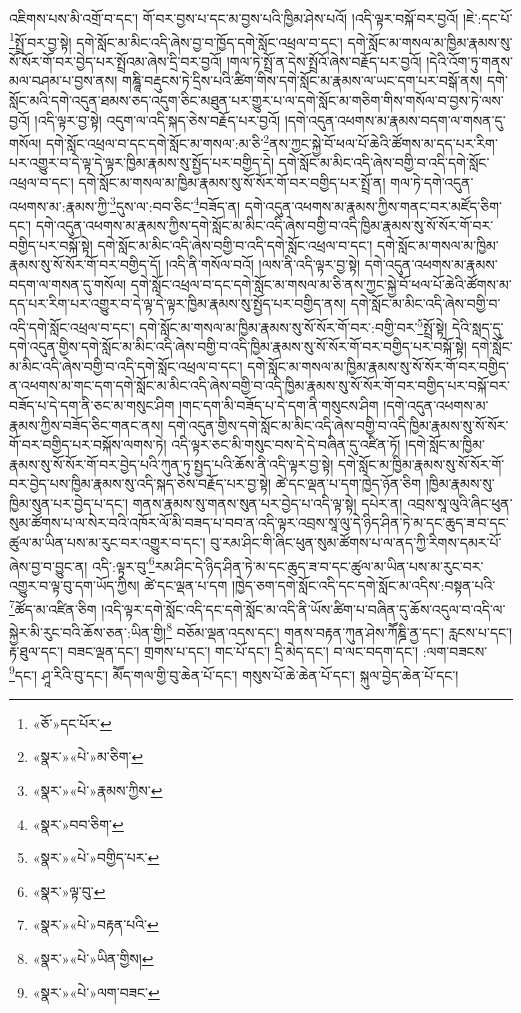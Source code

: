 འཇིགས་པས་མི་འགྲོ་བ་དང་། གོ་བར་བྱས་པ་དང་མ་བྱས་པའི་ཁྱིམ་ཤེས་པའོ། །འདི་ལྟར་བསྐོ་བར་བྱའོ། །ཇེ་:དང་པོ་\footnote{«ཅོ་»དང་པོར་}སྤྲོ་བར་བྱ་སྟེ། དགེ་སློང་མ་མིང་འདི་ཞེས་བྱ་བ་ཁྱོད་དགེ་སློང་འཕྲལ་བ་དང་། དགེ་སློང་མ་གསལ་མ་ཁྱིམ་རྣམས་སུ་སོ་སོར་གོ་བར་བྱེད་པར་སྤྲོའམ་ཞེས་དྲི་བར་བྱའོ། །གལ་ཏེ་སྤྲོ་ན་དེས་སྤྲོའོ་ཞེས་བརྗོད་པར་བྱའོ། །དེའི་འོག་ཏུ་གནས་མལ་བཤམ་པ་བྱས་ནས། གཎྜཱི་བརྡུངས་ཏེ་དྲིས་པའི་ཚིག་གིས་དགེ་སློང་མ་རྣམས་ལ་ཡང་དག་པར་བསྒོ་ནས། དགེ་སློང་མའི་དགེ་འདུན་ཐམས་ཅད་འདུག་ཅིང་མཐུན་པར་གྱུར་པ་ལ་དགེ་སློང་མ་གཅིག་གིས་གསོལ་བ་བྱས་ཏེ་ལས་བྱའོ། །འདི་ལྟར་བྱ་སྟེ། འདུག་ལ་འདི་སྐད་ཅེས་བརྗོད་པར་བྱའོ། །དགེ་འདུན་འཕགས་མ་རྣམས་བདག་ལ་གསན་དུ་གསོལ། དགེ་སློང་འཕྲལ་བ་དང་དགེ་སློང་མ་གསལ་:མ་ཅི་\footnote{«སྣར་»«པེ་»མ་ཅིག་}ནས་ཀྱང་སྐྱེ་བོ་ཕལ་པོ་ཆེའི་ཚོགས་མ་དད་པར་རིག་པར་འགྱུར་བ་དེ་ལྟ་དེ་ལྟར་ཁྱིམ་རྣམས་སུ་སྤྱོད་པར་བགྱིད་དེ། དགེ་སློང་མ་མིང་འདི་ཞེས་བགྱི་བ་འདི་དགེ་སློང་འཕྲལ་བ་དང་། དགེ་སློང་མ་གསལ་མ་ཁྱིམ་རྣམས་སུ་སོ་སོར་གོ་བར་བགྱིད་པར་སྤྲོ་ན། གལ་ཏེ་དགེ་འདུན་འཕགས་མ་:རྣམས་ཀྱི་\footnote{«སྣར་»«པེ་»རྣམས་ཀྱིས་}དུས་ལ་:བབ་ཅིང་\footnote{«སྣར་»བབ་ཅིག་}བཟོད་ན། དགེ་འདུན་འཕགས་མ་རྣམས་ཀྱིས་གནང་བར་མཛོད་ཅིག་དང་། དགེ་འདུན་འཕགས་མ་རྣམས་ཀྱིས་དགེ་སློང་མ་མིང་འདི་ཞེས་བགྱི་བ་འདི་ཁྱིམ་རྣམས་སུ་སོ་སོར་གོ་བར་བགྱིད་པར་བསྐོ་སྟེ། དགེ་སློང་མ་མིང་འདི་ཞེས་བགྱི་བ་འདི་དགེ་སློང་འཕྲལ་བ་དང་། དགེ་སློང་མ་གསལ་མ་ཁྱིམ་རྣམས་སུ་སོ་སོར་གོ་བར་བགྱིད་དོ། །འདི་ནི་གསོལ་བའོ། །ལས་ནི་འདི་ལྟར་བྱ་སྟེ། དགེ་འདུན་འཕགས་མ་རྣམས་བདག་ལ་གསན་དུ་གསོལ། དགེ་སློང་འཕྲལ་བ་དང་དགེ་སློང་མ་གསལ་མ་ཅི་ནས་ཀྱང་སྐྱེ་བོ་ཕལ་པོ་ཆེའི་ཚོགས་མ་དད་པར་རིག་པར་འགྱུར་བ་དེ་ལྟ་དེ་ལྟར་ཁྱིམ་རྣམས་སུ་སྤྱོད་པར་བགྱིད་ནས། དགེ་སློང་མ་མིང་འདི་ཞེས་བགྱི་བ་འདི་དགེ་སློང་འཕྲལ་བ་དང་། དགེ་སློང་མ་གསལ་མ་ཁྱིམ་རྣམས་སུ་སོ་སོར་གོ་བར་:བགྱི་བར་\footnote{«སྣར་»«པེ་»བགྱིད་པར་}སྤྲོ་སྟེ། དེའི་སླད་དུ་དགེ་འདུན་གྱིས་དགེ་སློང་མ་མིང་འདི་ཞེས་བགྱི་བ་འདི་ཁྱིམ་རྣམས་སུ་སོ་སོར་གོ་བར་བགྱིད་པར་བསྐོ་སྟེ། དགེ་སློང་མ་མིང་འདི་ཞེས་བགྱི་བ་འདི་དགེ་སློང་འཕྲལ་བ་དང་། དགེ་སློང་མ་གསལ་མ་ཁྱིམ་རྣམས་སུ་སོ་སོར་གོ་བར་བགྱིད་ན་འཕགས་མ་གང་དག་དགེ་སློང་མ་མིང་འདི་ཞེས་བགྱི་བ་འདི་ཁྱིམ་རྣམས་སུ་སོ་སོར་གོ་བར་བགྱིད་པར་བསྐོ་བར་བཟོད་པ་དེ་དག་ནི་ཅང་མ་གསུང་ཤིག །གང་དག་མི་བཟོད་པ་དེ་དག་ནི་གསུངས་ཤིག །དགེ་འདུན་འཕགས་མ་རྣམས་ཀྱིས་བཟོད་ཅིང་གནང་ནས། དགེ་འདུན་གྱིས་དགེ་སློང་མ་མིང་འདི་ཞེས་བགྱི་བ་འདི་ཁྱིམ་རྣམས་སུ་སོ་སོར་གོ་བར་བགྱིད་པར་བསྐོས་ལགས་ཏེ། འདི་ལྟར་ཅང་མི་གསུང་བས་དེ་དེ་བཞིན་དུ་འཛིན་ཏོ། །དགེ་སློང་མ་ཁྱིམ་རྣམས་སུ་སོ་སོར་གོ་བར་བྱེད་པའི་ཀུན་ཏུ་སྤྱད་པའི་ཆོས་ནི་འདི་ལྟར་བྱ་སྟེ། དགེ་སློང་མ་ཁྱིམ་རྣམས་སུ་སོ་སོར་གོ་བར་བྱེད་པས་ཁྱིམ་རྣམས་སུ་འདི་སྐད་ཅེས་བརྗོད་པར་བྱ་སྟེ། ཚེ་དང་ལྡན་པ་དག་ཁྱེད་ཉོན་ཅིག །ཁྱིམ་རྣམས་སུ་ཁྱིམ་སུན་པར་བྱེད་པ་དང་། གནས་རྣམས་སུ་གནས་སུན་པར་བྱེད་པ་འདི་ལྟ་སྟེ། དཔེར་ན། འབྲས་སཱ་ལུའི་ཞིང་ཕུན་སུམ་ཚོགས་པ་ལ་སེར་བའི་འཁོར་ལོ་མི་བཟད་པ་བབ་ན་འདི་ལྟར་འབྲས་སཱ་ལུ་དེ་ཉིད་ཤིན་ཏེ་མ་དང་ཆུད་ཟ་བ་དང་ཚུལ་མ་ཡིན་པས་མ་རུང་བར་འགྱུར་བ་དང་། བུ་རམ་ཤིང་གི་ཞིང་ཕུན་སུམ་ཚོགས་པ་ལ་ནད་ཀྱི་རིགས་དམར་པོ་ཞེས་བྱ་བ་བྱུང་ན། འདི་:ལྟར་བུ་\footnote{«སྣར་»ལྟ་བུ་}རམ་ཤིང་དེ་ཉིད་ཤིན་ཏེ་མ་དང་ཆུད་ཟ་བ་དང་ཚུལ་མ་ཡིན་པས་མ་རུང་བར་འགྱུར་བ་ལྟ་བུ་དག་ཡོད་ཀྱིས། ཚེ་དང་ལྡན་པ་དག །ཁྱེད་ཅག་དགེ་སློང་འདི་དང་དགེ་སློང་མ་འདིས་:བསྟན་པའི་\footnote{«སྣར་»«པེ་»བརྟན་པའི་}ཚོད་མ་འཛིན་ཅིག །འདི་ལྟར་དགེ་སློང་འདི་དང་དགེ་སློང་མ་འདི་ནི་ཡོས་ཚིག་པ་བཞིན་དུ་ཆོས་འདུལ་བ་འདི་ལ་སྐྱེར་མི་རུང་བའི་ཆོས་ཅན་:ཡིན་གྱི།\footnote{«སྣར་»«པེ་»ཡིན་གྱིས།} བཅོམ་ལྡན་འདས་དང་། གནས་བརྟན་ཀུན་ཤེས་ཀཽཎྜི་ནྱ་དང་། རླངས་པ་དང་། རྟ་ཐུལ་དང་། བཟང་ལྡན་དང་། གྲགས་པ་དང་། གང་པོ་དང་། དྲི་མེད་དང་། བ་ལང་བདག་དང་། :ལག་བཟངས་\footnote{«སྣར་»«པེ་»ལག་བཟང་}དང་། ཤཱ་རིའི་བུ་དང་། མཽད་གལ་གྱི་བུ་ཆེན་པོ་དང་། གསུས་པོ་ཆེ་ཆེན་པོ་དང་། སྐུལ་བྱེད་ཆེན་པོ་དང་། 